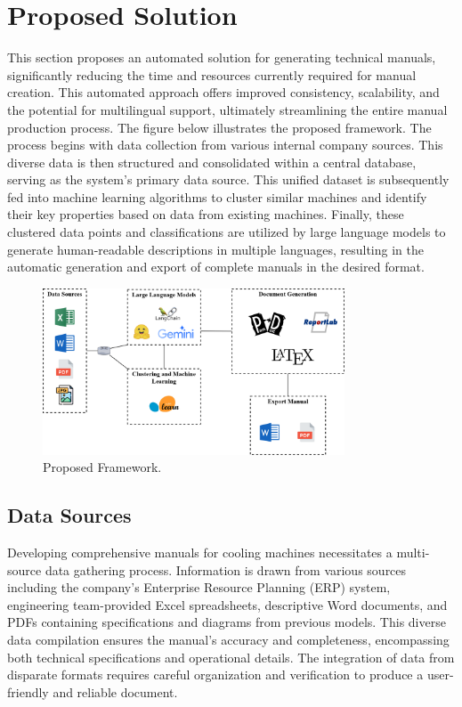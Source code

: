 \documentclass{article}%
\begin{document}
\section{Proposed Solution}%
\label{sec:ProposedSolution}%
This section proposes an automated solution for generating technical manuals, significantly reducing the time and resources currently required for manual creation.  This automated approach offers improved consistency, scalability, and the potential for multilingual support, ultimately streamlining the entire manual production process.\newline%
The figure below illustrates the proposed framework.  The process begins with data collection from various internal company sources. This diverse data is then structured and consolidated within a central database, serving as the system's primary data source.  This unified dataset is subsequently fed into machine learning algorithms to cluster similar machines and identify their key properties based on data from existing machines.  Finally, these clustered data points and classifications are utilized by large language models to generate human{-}readable descriptions in multiple languages, resulting in the automatic generation and export of complete manuals in the desired format.%


\begin{figure}[h!]%
\centering%
\includegraphics[width=0.8\textwidth]{images/Tools.png}%
\caption{Proposed Framework.}%
\end{figure}

%
\subsection{Data Sources}%
\label{subsec:DataSources}%
Developing comprehensive manuals for cooling machines necessitates a multi{-}source data gathering process.  Information is drawn from various sources including the company's Enterprise Resource Planning (ERP) system, engineering team{-}provided Excel spreadsheets, descriptive Word documents, and PDFs containing specifications and diagrams from previous models.\newline%
This diverse data compilation ensures the manual's accuracy and completeness, encompassing both technical specifications and operational details.  The integration of data from disparate formats requires careful organization and verification to produce a user{-}friendly and reliable document.
\end{document}
